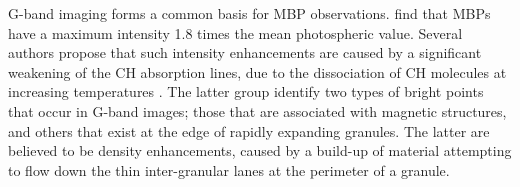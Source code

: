 \documentclass{emulateapj}
\begin{document}

G-band imaging forms a common basis for MBP observations. \cite{Alm04} find that MBPs have a maximum intensity 1.8 times the mean photospheric value. Several authors propose that such intensity enhancements are caused by a significant weakening of the CH absorption lines, due to the dissociation of CH molecules at increasing temperatures \cite[]{Alm01,Ste01,Lan02}.  The latter group identify two types of bright points that occur in G-band images; those that are associated with magnetic structures, and others that exist at the edge of rapidly expanding granules.  The latter are believed to be density enhancements, caused by a build-up of material attempting to flow down the thin inter-granular lanes at the perimeter of a granule.     
\end{document}

